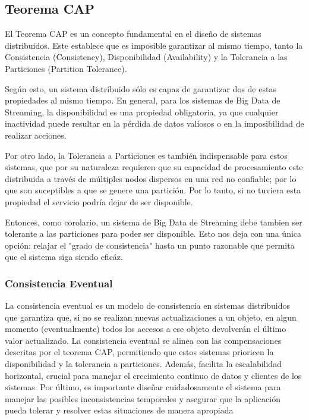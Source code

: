 \subsection{Teorema CAP}
El Teorema CAP es un concepto fundamental en el diseño de sistemas distribuidos. 
Este establece que es imposible garantizar al mismo tiempo, tanto la Consistencia (Consistency), 
Disponibilidad (Availability) y la Tolerancia a las Particiones (Partition Tolerance).

Según esto, un sistema distribuido sólo es capaz de garantizar dos de estas propiedades al mismo tiempo. 
En general, para los sistemas de Big Data de Streaming, la disponibilidad es una propiedad obligatoria, ya que cualquier inactividad puede 
resultar en la pérdida de datos valiosos o en la imposibilidad de realizar acciones.

Por otro lado, la Tolerancia a Particiones es también indispensable para estos sistemas, que por su naturaleza requieren que su capacidad de 
procesamiento este distribuida a través de múltiples nodos dispersos en una red no confiable; por lo que son suceptibles 
a que se genere una partición. Por lo tanto, si no tuviera esta propiedad el servicio podría dejar de ser disponible. 

Entonces, como corolario, un sistema de Big Data de Streaming debe tambien ser tolerante a las particiones para poder ser disponible.
Esto nos deja con una única opción: relajar el "grado de consistencia" hasta un punto razonable que permita que el sistema siga siendo eficáz.\parencite{capteo}
\newpage
\subsubsection{Consistencia Eventual}
La consistencia eventual es un modelo de consistencia en sistemas distribuidos que garantiza que, 
si no se realizan nuevas actualizaciones a un objeto, en algun momento (eventualmente) todos los accesos a ese objeto 
devolverán el último valor actualizado.  
La consistencia eventual se alinea con las compensaciones descritas por el teorema CAP, 
permitiendo que estos sistemas prioricen la disponibilidad y la tolerancia a particiones. 
Además, facilita la escalabilidad horizontal, crucial para manejar el crecimiento continuo de datos y clientes de los sistemas.
Por último, es importante diseñar cuidadosamente el sistema para manejar las posibles inconsistencias temporales 
y asegurar que la aplicación pueda tolerar y resolver estas situaciones de manera apropiada \parencite{capteo}

